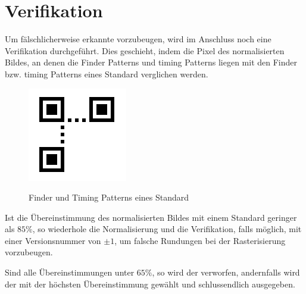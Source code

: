 \section{Verifikation}
Um fälschlicherweise erkannte \QRCodes vorzubeugen, wird im Anschluss noch eine Verifikation durchgeführt. Dies geschieht, indem die Pixel des normalisierten Bildes, an denen die Finder Patterns und timing Patterns liegen mit den Finder bzw. timing Patterns eines Standard \QRCodes verglichen werden.
\begin{figure}[h]
\centering
\includegraphics[scale=0.5]{images/verifikation.png}
\label{fig:version-qrcode}\caption{Finder und Timing Patterns eines Standard \QRCode}
\end{figure}

Ist die Übereinstimmung des normalisierten Bildes mit einem Standard \QRCode geringer als $85\%$, so wiederhole die Normalisierung und die Verifikation, falls möglich, mit einer Versionsnummer von $\pm 1$, um falsche Rundungen bei der Rasterisierung vorzubeugen.

Sind alle Übereinstimmungen unter $65\%$, so wird der \QRCode verworfen, andernfalls wird der \QRCode mit der höchsten Übereinstimmung gewählt und schlussendlich ausgegeben.
